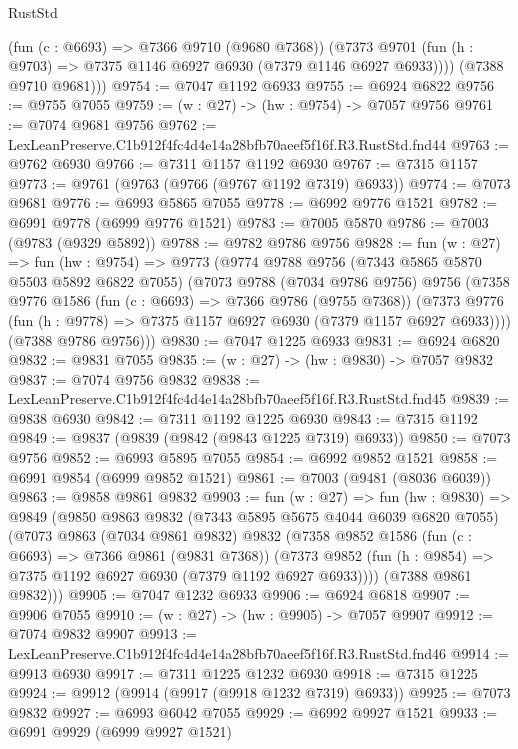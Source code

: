 \begin{lexlean}{RustStd}
\begin{coremodule}
          (fun (c : @6693) => @7366 @9710 (@9680 @7368))
          (@7373 @9701 (fun (h : @9703) => @7375 @1146 @6927 @6930 (@7379 @1146 @6927 @6933))))
        (@7388 @9710 @9681)))
@9754 := @7047 @1192 @6933
@9755 := @6924 @6822
@9756 := @9755 @7055
@9759 := (w : @27) -> (hw : @9754) -> @7057 @9756
@9761 := @7074 @9681 @9756
@9762 := LexLeanPreserve.C1b912f4fc4d4e14a28bfb70aeef5f16f.R3.RustStd.fnd44
@9763 := @9762 @6930
@9766 := @7311 @1157 @1192 @6930
@9767 := @7315 @1157
@9773 := @9761 (@9763 (@9766 (@9767 @1192 @7319) @6933))
@9774 := @7073 @9681
@9776 := @6993 @5865 @7055
@9778 := @6992 @9776 @1521
@9782 := @6991 @9778 (@6999 @9776 @1521)
@9783 := @7005 @5870
@9786 := @7003 (@9783 (@9329 @5892))
@9788 := @9782 @9786 @9756
@9828 := fun (w : @27) =>
  fun (hw : @9754) =>
  @9773
    (@9774
      @9788
      @9756
      (@7343 @5865 @5870 @5503 @5892 @6822 @7055)
      (@7073
        @9788
        (@7034 @9786 @9756)
        @9756
        (@7358
          @9776
          @1586
          (fun (c : @6693) => @7366 @9786 (@9755 @7368))
          (@7373 @9776 (fun (h : @9778) => @7375 @1157 @6927 @6930 (@7379 @1157 @6927 @6933))))
        (@7388 @9786 @9756)))
@9830 := @7047 @1225 @6933
@9831 := @6924 @6820
@9832 := @9831 @7055
@9835 := (w : @27) -> (hw : @9830) -> @7057 @9832
@9837 := @7074 @9756 @9832
@9838 := LexLeanPreserve.C1b912f4fc4d4e14a28bfb70aeef5f16f.R3.RustStd.fnd45
@9839 := @9838 @6930
@9842 := @7311 @1192 @1225 @6930
@9843 := @7315 @1192
@9849 := @9837 (@9839 (@9842 (@9843 @1225 @7319) @6933))
@9850 := @7073 @9756
@9852 := @6993 @5895 @7055
@9854 := @6992 @9852 @1521
@9858 := @6991 @9854 (@6999 @9852 @1521)
@9861 := @7003 (@9481 (@8036 @6039))
@9863 := @9858 @9861 @9832
@9903 := fun (w : @27) =>
  fun (hw : @9830) =>
  @9849
    (@9850
      @9863
      @9832
      (@7343 @5895 @5675 @4044 @6039 @6820 @7055)
      (@7073
        @9863
        (@7034 @9861 @9832)
        @9832
        (@7358
          @9852
          @1586
          (fun (c : @6693) => @7366 @9861 (@9831 @7368))
          (@7373 @9852 (fun (h : @9854) => @7375 @1192 @6927 @6930 (@7379 @1192 @6927 @6933))))
        (@7388 @9861 @9832)))
@9905 := @7047 @1232 @6933
@9906 := @6924 @6818
@9907 := @9906 @7055
@9910 := (w : @27) -> (hw : @9905) -> @7057 @9907
@9912 := @7074 @9832 @9907
@9913 := LexLeanPreserve.C1b912f4fc4d4e14a28bfb70aeef5f16f.R3.RustStd.fnd46
@9914 := @9913 @6930
@9917 := @7311 @1225 @1232 @6930
@9918 := @7315 @1225
@9924 := @9912 (@9914 (@9917 (@9918 @1232 @7319) @6933))
@9925 := @7073 @9832
@9927 := @6993 @6042 @7055
@9929 := @6992 @9927 @1521
@9933 := @6991 @9929 (@6999 @9927 @1521)

\end{coremodule}
\end{lexlean}
